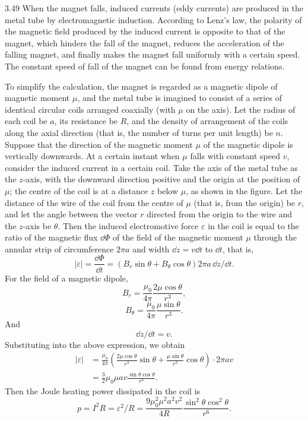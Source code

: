 \begin{solution}{3.49}
When the magnet falls, induced currents (eddy currents) are produced in the metal tube by electromagnetic induction. According to Lenz's law, the polarity of the magnetic field produced by the induced current is opposite to that of the magnet, which hinders the fall of the magnet, reduces the acceleration of the falling magnet, and finally makes the magnet fall uniformly with a certain speed. The constant speed of fall of the magnet can be found from energy relations.

To simplify the calculation, the magnet is regarded as a magnetic dipole of magnetic moment $\mu$, and the metal tube is imagined to consist of a series of identical circular coils arranged coaxially (with $\mu$ on the axis). Let the radius of each coil be $a$, its resistance be $R$, and the density of arrangement of the coils along the axial direction (that is, the number of turns per unit length) be $n$. Suppose that the direction of the magnetic moment $\mu$ of the magnetic dipole is vertically downwards. At a certain instant when $\mu$ falls with constant speed $v$, consider the induced current in a certain coil. Take the axis of the metal tube as the $z$-axis, with the downward direction positive and the origin at the position of $\mu$; the centre of the coil is at a distance $z$ below $\mu$, as shown in the figure. Let the distance of the wire of the coil from the centre of $\mu$ (that is, from the origin) be $r$, and let the angle between the vector $r$ directed from the origin to the wire and the $z$-axis be $\theta$. Then the induced electromotive force $\varepsilon$ in the coil is equal to the ratio of the magnetic flux $\dd\Phi$ of the field of the magnetic moment $\mu$ through the annular strip of circumference $2\pi a$ and width $\dd z=v\dd t$ to $\dd t$, that is,
\[
|\varepsilon|=\frac{\dd\Phi}{\dd t}=\left(B_r\sin\theta+B_\theta\cos\theta\right)2\pi a\,\dd z/\dd t.
\]
For the field of a magnetic dipole,
\[
B_r=\frac{\mu_0}{4\pi}\frac{2\mu\cos\theta}{r^3},
\]
\[
B_\theta=\frac{\mu_0}{4\pi}\frac{\mu\sin\theta}{r^3}.
\]
And
\[
\dd z/\dd t=v.
\]
Substituting into the above expression, we obtain
\begin{align*}
|\varepsilon| &= \frac{\mu_0}{4\pi}\left(\frac{2\mu\cos\theta}{r^3}\sin\theta+\frac{\mu\sin\theta}{r^3}\cos\theta\right)\cdot2\pi av\\
&= \frac{3}{2}\mu_0\mu av\frac{\sin\theta\cos\theta}{r^3}.
\end{align*}
Then the Joule heating power dissipated in the coil is
\[
p=I^2R=\varepsilon^2/R=\frac{9\mu_0^2\mu^2a^2v^2}{4R}\frac{\sin^2\theta\cos^2\theta}{r^6}.
\]


\end{solution}
